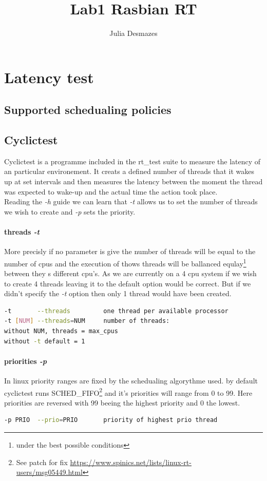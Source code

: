 \documentclass[10pt,a4paper]{article}
\author{Julia Desmazes}
\title{Lab1 Rasbian RT}
\begin{document}
\section{Latency test}
\subsection{Supported schedualing policies}
\subsection{Cyclictest}
Cyclictest is a programme included in the rt\_test suite to measure the latency of an particular environement. It creats a defined number of threads that it wakes up at set intervals and then measures the latency between the moment the thread was expected to wake-up and the actual time the action took place.\\
Reading the \emph{-h} guide we can learn that \emph{-t} allows us to set the number of threads we wish to create and \emph{-p} sets the priority. 
\paragraph{threads \emph{-t}}
More precisly if no parameter is give the number of threads will be equal to the number of cpus and the execution of thows threads will be ballanced equlay\footnote{under the best possible conditions} between they s different cpu's. As we are currently on a 4 cpu system if we wish to create 4 threads leaving it to the default option would be correct. But if we didn't specify the \emph{-t} option then only 1 thread would have been created.
\begin{lstlisting}[language=bash,caption={cyclictest -h}]
-t       --threads         one thread per available processor
-t [NUM] --threads=NUM     number of threads:
without NUM, threads = max_cpus
without -t default = 1
\end{lstlisting}
\paragraph{priorities \emph{-p}}
In linux priority ranges are fixed by the schedualing algorythme used. by default cyclictest runs SCHED\_FIFO\footnote{See patch for fix \url{https://www.spinics.net/lists/linux-rt-users/msg05449.html}} and it's priorities will range from 0 to 99. Here priorities are reversed with 99 beeing the highest priority and 0 the lowest.
\begin{lstlisting}[language=bash,caption={cyclictest -h}]
-p PRIO  --prio=PRIO       priority of highest prio thread
\end{lstlisting}
\end{document}
